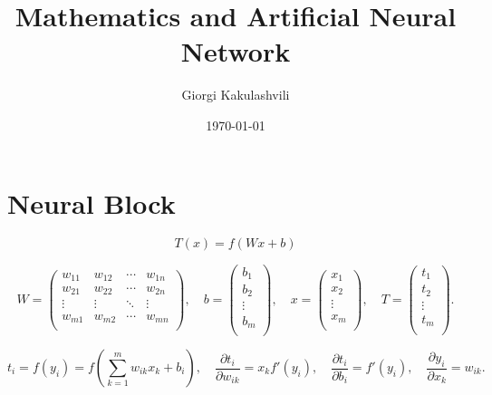 \documentclass{article}
\numberwithin{equation}{section}
\theoremstyle{definition}
\theoremstyle{remark}
\begin{document}
\title{Mathematics and Artificial Neural Network}
\author{Giorgi Kakulashvili}
\date{\today}
\maketitle
\thispagestyle{fancy}



\section{Neural Block}


\begin{equation}\label{eq-basic-tr}
    T(x) = f\left( Wx + b \right)
\end{equation}

\[
    W = \begin{pmatrix}
        w_{11} & w_{12} & \cdots & w_{1n} \\
        w_{21} & w_{22} & \cdots & w_{2n} \\
        \vdots & \vdots & \ddots & \vdots \\
        w_{m1} & w_{m2} & \cdots & w_{mn} \\
    \end{pmatrix},
    \quad
    b = \begin{pmatrix}
        b_{1}  \\
        b_{2} \\
        \vdots \\
        b_{m} \\
    \end{pmatrix},
    \quad
    x = \begin{pmatrix}
        x_{1}  \\
        x_{2} \\
        \vdots \\
        x_{m} \\
    \end{pmatrix}, 
    \quad
    T = \begin{pmatrix}
        t_{1}  \\
        t_{2} \\
        \vdots \\
        t_{m} \\
    \end{pmatrix}.
\]

\[
    t_{i} = f(y_{i}) = f\left(\sum_{k=1}^{m} w_{ik} x_{k} + b_{i}\right), \quad
    \frac{\partial t_{i}}{\partial w_{ik}} = x_{k} f'(y_{i}), \quad
    \frac{\partial t_{i}}{\partial b_{i}} = f'(y_{i}), \quad
    \frac{\partial y_{i}}{\partial x_{k}} = w_{ik}.
\]
\end{document}
